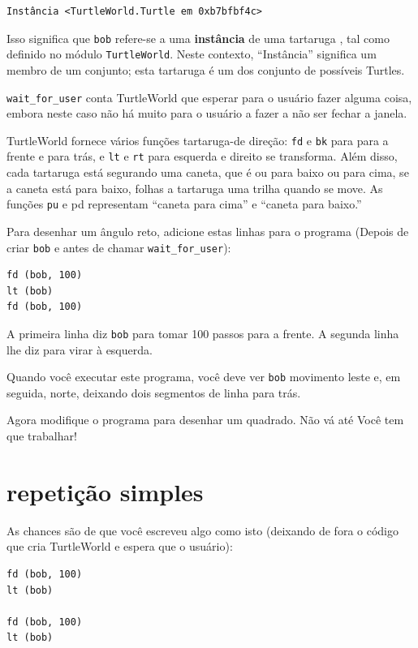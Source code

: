 \documentclass[10pt]{book}
\begin{document}
\begin{exercise}
\begin{verbatim}
Instância <TurtleWorld.Turtle em 0xb7bfbf4c>
\end{verbatim}
%
Isso significa que {\tt bob} refere-se a
uma {\bf instância} de uma tartaruga
, tal como definido no módulo {\tt TurtleWorld}. Neste contexto,
``Instância'' significa um membro de um conjunto;
esta tartaruga é um dos conjunto de possíveis Turtles.

\Verb "wait_for_user" conta TurtleWorld que esperar para o usuário
fazer alguma coisa, embora neste caso não há muito para
o usuário a fazer a não ser fechar a janela.

TurtleWorld fornece vários
funções tartaruga-de direção: {\tt fd} e {\tt bk} para
para a frente e para trás, e {\tt lt} e {\tt rt} para esquerda e
direito se transforma. Além disso, cada tartaruga está segurando uma caneta, que é
ou para baixo ou para cima, se a caneta está para baixo, folhas a tartaruga
uma trilha quando se move. As funções {\tt pu} e {pd \tt}
representam ``caneta para cima'' e ``caneta para baixo.''

Para desenhar um ângulo reto, adicione estas linhas para o programa
(Depois de criar {\tt bob} e antes de chamar \verb "wait_for_user"):

\begin{verbatim}
fd (bob, 100)
lt (bob)
fd (bob, 100)
\end{verbatim}
%
A primeira linha diz {\tt bob} para tomar 100 passos
para a frente. A segunda linha lhe diz para virar à esquerda.

Quando você executar este programa, você deve ver {\tt bob} movimento leste e, em seguida,
norte, deixando dois segmentos de linha para trás.

Agora modifique o programa para desenhar um quadrado. Não vá até
Você tem que trabalhar!


\section{repetição simples}
\label{repetição}

As chances são de que você escreveu algo como isto (deixando de fora o código
que cria TurtleWorld e espera que o usuário):

\begin{verbatim}
fd (bob, 100)
lt (bob)

fd (bob, 100)
lt (bob)


\end{verbatim}
\end{exercise}
\end{document}
